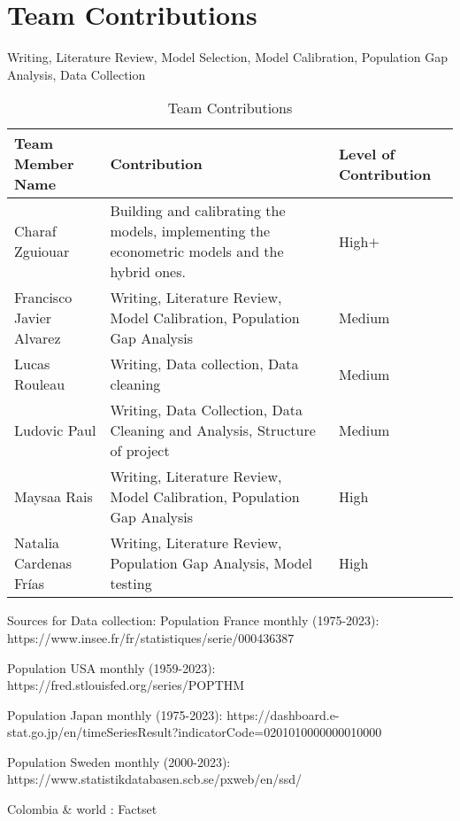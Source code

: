 \documentclass[hidelinks,11pts]{article}
\DeclareMathOperator{\1}{\mathbbm{1}}
\begin{document}
\section*{Team Contributions}

Writing, Literature Review, Model Selection, Model Calibration, Population Gap Analysis, Data Collection
\begin{table}[ht]
    \centering
    \begin{tabularx}{\textwidth}{|l|X|l|}
        \hline
        \textbf{Team Member Name} & \textbf{Contribution} & \textbf{Level of Contribution} \\
        \hline
        Charaf Zguiouar          & Building and calibrating the models, implementing the econometric models and the hybrid ones.   &  High$+$ \\ 
        \hline
        Francisco Javier Alvarez  & Writing, Literature Review, Model Calibration, Population Gap Analysis &  Medium \\
        \hline
        Lucas Rouleau             & Writing, Data collection, Data cleaning & Medium\\
        \hline
        Ludovic Paul              & Writing, Data Collection, Data Cleaning and Analysis, Structure of project & Medium \\
        \hline
        Maysaa Rais               & Writing, Literature Review, Model Calibration, Population Gap Analysis &  High\\
        \hline
        Natalia Cardenas Frías   & Writing, Literature Review, Population Gap Analysis, Model testing &  High\\
        \hline
    \end{tabularx}
    \caption{Team Contributions}
    \label{tab:contributions}
\end{table}

\newpage


Sources for Data collection: 
Population France monthly (1975-2023): https://www.insee.fr/fr/statistiques/serie/000436387

Population USA monthly (1959-2023): https://fred.stlouisfed.org/series/POPTHM

Population Japan monthly  (1975-2023): https://dashboard.e-stat.go.jp/en/timeSeriesResult?indicatorCode=0201010000000010000 


Population Sweden monthly  (2000-2023): https://www.statistikdatabasen.scb.se/pxweb/en/ssd/

Colombia & world : Factset
\end{document}
